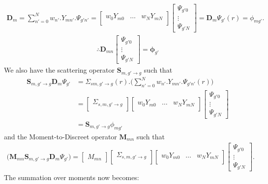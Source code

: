 \documentclass[11pt,letterpaper,titlepage]{article}
\numberwithin{equation}{section}
\begin{document}
\begin{align*}
\mathbf{D}_m = \sum_{n'=0}^{N} w_{n'} . Y_{m n'}.\Psi_{g'n'}
= 
\begin{bmatrix}
w_0 Y_{m0} &\hdots  &w_{N} Y_{mN}\\
\end{bmatrix}
\begin{bmatrix}
\Psi_{g'0} \\
\vdots    \\
\Psi_{g'N}
\end{bmatrix}
=\mathbf{D}_m\Psi_{g'}(r) =\phi_{mg'}.
\end{align*}
\begin{align*}
\therefore 
\mathbf{D}_{mn} \begin{bmatrix}
\Psi_{g'0} \\
\vdots    \\
\Psi_{g'N}
\end{bmatrix} = \mathbf{\phi}_{g'}
\end{align*}
\newline
We also have the scattering operator $\mathbf{S}_{m,g'{\to}g}$ such that
\begin{align*}
\mathbf{S}_{m,g'{\to}g} \mathbf{D}_m\Psi_{g'} &= 
\Sigma_{sm,g'{\to}g} (r)
. \biggr(
\sum_{n'=0}^{N} w_{n'} . Y_{m n'}.\Psi_{g'n'}(r) 
\biggr)\\
&=
\begin{bmatrix}
\Sigma_{s,m,g'{\to}g} \\
\end{bmatrix}
\begin{bmatrix}
w_0 Y_{m 0} &\hdots  &w_{N} Y_{m N}\\
\end{bmatrix}
\begin{bmatrix}
\Psi_{g'0} \\
\vdots    \\
\Psi_{g'N}
\end{bmatrix} \\
&=\mathbf{S}_{m,g'{\to}g} \phi_{mg'}
\end{align*}
and the Moment-to-Discreet operator $\mathbf{M}_{mn}$ such that 
\begin{align*}
\biggr(\mathbf{M}_{mn}\mathbf{S}_{m,g'{\to}g} \mathbf{D}_m\Psi_{g'}\biggr)= 
\begin{bmatrix}
M_{mn}
\end{bmatrix}
\begin{bmatrix}
\Sigma_{s,m,g'{\to}g} \\
\end{bmatrix}
\begin{bmatrix}
w_0 Y_{m0} &\hdots  &w_{N} Y_{mN}\\
\end{bmatrix}
\begin{bmatrix}
\Psi_{g'0} \\
\vdots    \\
\Psi_{g'N}
\end{bmatrix}.
\end{align*}
\newline
\noindent The summation over moments now becomes:
\end{document}
